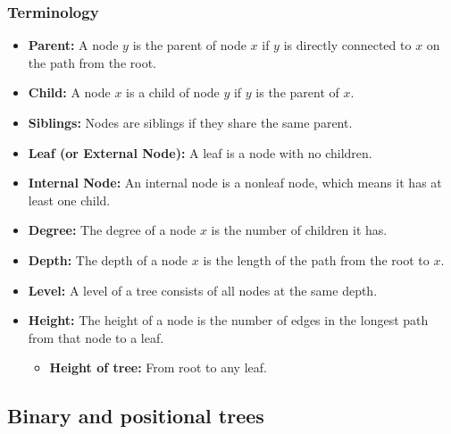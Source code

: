    \subsubsection{Terminology}
    \begin{terminology}
        \begin{itemize}            
            \item \textbf{Parent:} A node \( y \) is the parent of node \( x \) if \( y \) is directly connected to \( x \) on the path from the root.
            
            \item \textbf{Child:} A node \( x \) is a child of node \( y \) if \( y \) is the parent of \( x \).
            
            \item \textbf{Siblings:} Nodes are siblings if they share the same parent.
            
            \item \textbf{Leaf (or External Node):} A leaf is a node with no children.
            
            \item \textbf{Internal Node:} An internal node is a nonleaf node, which means it has at least one child.
            
            \item \textbf{Degree:} The degree of a node \( x \) is the number of children it has.
            
            \item \textbf{Depth:} The depth of a node \( x \) is the length of the path from the root to \( x \).
            
            \item \textbf{Level:} A level of a tree consists of all nodes at the same depth.
            
            \item \textbf{Height:} The height of a node is the number of edges in the longest path from that node to a leaf.
            \begin{itemize}
                \item \textbf{Height of tree:} From root to any leaf.
            \end{itemize}
            
        \end{itemize}
    \end{terminology}

\subsection{Binary and positional trees}
